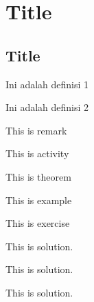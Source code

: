 \documentclass[12pt,a4paper,violet]{bbe}
\begin{document}
	\chapter{Title}
	\section{Title}
	\begin{definition}
	Ini adalah definisi 1
	\end{definition}
	\begin{definition}
	Ini adalah definisi 2
	\end{definition}
	\begin{remark}
	This is remark
	\end{remark}
	\begin{activity}
	This is activity 
	\end{activity}
  \begin{theorem}
    This is theorem
  \end{theorem}
  \begin{example}
    This is example
  \end{example}
  \begin{exercise}
    This is exercise
  \end{exercise}
  \begin{solution}
    This is solution. 
  \end{solution}

  \begin{generality}
    This is solution. 
  \end{generality}
  \begin{property}
    This is solution. 
  \end{property}


	\blinddocument
\end{document}
